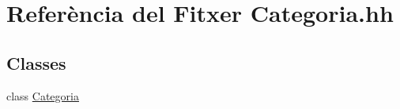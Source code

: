 \hypertarget{_categoria_8hh}{}\section{Referència del Fitxer Categoria.\+hh}
\label{_categoria_8hh}
\subsection*{Classes}
\begin{DoxyCompactItemize}
\item 
class \mbox{\hyperlink{class_categoria}{Categoria}}
\end{DoxyCompactItemize}
